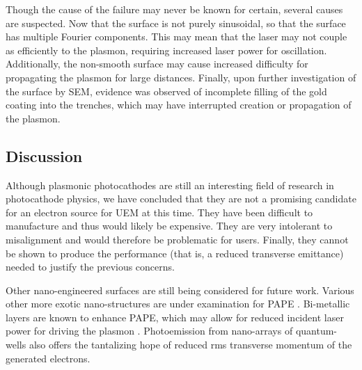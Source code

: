 Though the cause of the failure may never be known for certain, several causes are suspected.
Now that the surface is not purely sinusoidal, so that the surface has multiple Fourier components.
This may mean that the laser may not couple as efficiently to the plasmon, requiring increased laser power for oscillation. 
Additionally, the non-smooth surface may cause increased difficulty for propagating the plasmon for large distances.
Finally, upon further investigation of the surface by SEM, evidence was observed of incomplete filling of the gold coating into the trenches, which may have interrupted creation or propagation of the plasmon.

\subsection{Discussion}

Although plasmonic photocathodes are still an interesting field of research in photocathode physics, we have concluded that they are not a promising candidate for an electron source for UEM at this time.
They have been difficult to manufacture and thus would likely be expensive.
They are very intolerant to misalignment and would therefore be problematic for users.
Finally, they cannot be shown to produce the performance (that is, a reduced transverse emittance) needed to justify the previous concerns.

Other nano-engineered surfaces are still being considered for future work.
Various other more exotic nano-structures are under examination for PAPE \cite{li_surface_2013}.
Bi-metallic layers are known to enhance PAPE, which may allow for reduced incident laser power for driving the plasmon \cite{kupersztych_anomalous_2005}.
Photoemission from nano-arrays of quantum-wells also offers the tantalizing hope of reduced rms transverse momentum of the generated electrons.


